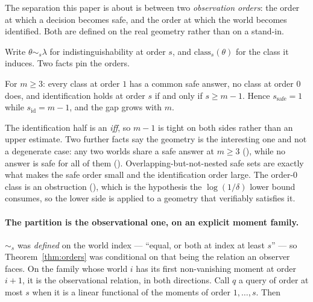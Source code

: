 The separation this paper is about is between two \emph{observation orders}: the order at
which a decision becomes safe, and the order at which the world becomes identified. Both
are defined on the real  geometry rather than on a stand-in.

Write $\theta\sim_{s}\lambda$ for indistinguishability at order $s$, and
$\mathrm{class}_{s}(\theta)$ for the class it induces. Two facts pin the orders.

\begin{theorem}
\label{thm:orders}
For $m\ge3$: every class at order $1$ has a common safe answer, no class at order $0$ does,
and identification holds at order $s$ if and only if $s\ge m-1$. Hence
$s_{\mathrm{safe}}=1$ while $s_{\mathrm{id}}=m-1$, and the gap grows with $m$.
\end{theorem}

The identification half is an \emph{iff}, so $m-1$ is tight on both sides rather than an
upper estimate. Two further facts say the geometry is the interesting one and not a
degenerate case: any two worlds share a safe answer at $m\ge3$
(), while no answer is safe for all of them
(). Overlapping-but-not-nested safe sets are exactly what makes
the safe order small and the identification order large. The order-$0$ class is an
obstruction (), which is the hypothesis the
$\log(1/\delta)$ lower bound consumes, so the lower side is applied to a geometry that
verifiably satisfies it.


\paragraph{The partition is the observational one, on an explicit moment family.}
$\sim_{s}$ was \emph{defined} on the world index --- ``equal, or both at index at least
$s$'' --- so Theorem~\ref{thm:orders} was conditional on that being the relation an
observer faces. On the family whose world $i$ has its first non-vanishing moment at order
$i+1$, it is the observational relation, in both directions. Call $q$ a query of order at
most $s$ when it is a linear functional of the moments of order $1,\dots,s$. Then

